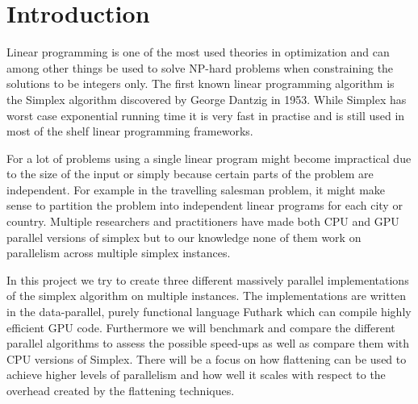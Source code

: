 \section{Introduction}
Linear programming is one of the most used theories in optimization and can among other things be used to solve NP-hard problems when constraining the solutions to be integers only. The first known linear programming algorithm is the Simplex algorithm discovered by George Dantzig in 1953. While Simplex has worst case exponential running time it is very fast in practise and is still used in most of the shelf linear programming frameworks. 

For a lot of problems using a single linear program might become impractical due to the size of the input or simply because certain parts of the problem are independent. For example in the travelling salesman problem, it might make sense to partition the problem into independent linear programs for each city or country. Multiple researchers and practitioners have made both CPU and GPU parallel versions of simplex but to our knowledge none of them work on parallelism across multiple simplex instances.

\newpar In this project we try to create three different massively parallel implementations of the simplex algorithm on multiple instances. The implementations are written in the data-parallel, purely functional language Futhark which can compile highly efficient GPU code. Furthermore we will benchmark and compare the different parallel algorithms to assess the possible speed-ups as well as compare them with CPU versions of Simplex. There will be a focus on how flattening can be used to achieve higher levels of parallelism and how well it scales with respect to the overhead created by the flattening techniques.

